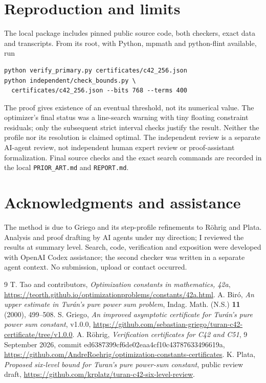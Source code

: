 \documentclass[11pt]{amsart}
\begin{document}
\section{Reproduction and limits}
The local package includes pinned public source code, both checkers,
exact data and transcripts. From its root, with Python, mpmath and
python-flint available, run
\begin{verbatim}
python verify_primary.py certificates/c42_256.json
python independent/check_bounds.py \
  certificates/c42_256.json --bits 768 --terms 400
\end{verbatim}
The proof gives existence of an eventual threshold, not its numerical
value. The optimizer's final status was a line-search warning with tiny
floating constraint residuals; only the subsequent strict interval
checks justify the result. Neither the profile nor its resolution is
claimed optimal. The independent review is a separate AI-agent review,
not independent human expert review or proof-assistant formalization.
Final source checks and the exact search commands are recorded in the
local \texttt{PRIOR\_ART.md} and \texttt{REPORT.md}.

\section*{Acknowledgments and assistance}
The method is due to Griego and its step-profile refinements to R\"ohrig
and Plata. Analysis and proof drafting by AI agents under my direction;
I reviewed the results at summary level. Search, code, verification and exposition were developed with
OpenAI Codex assistance; the second checker was written in a separate
agent context. No submission, upload or contact occurred.

\begin{thebibliography}{9}
 T. Tao and contributors, \emph{Optimization constants in
mathematics, 42a}, \url{https://teorth.github.io/optimizationproblems/constants/42a.html}.
\bibitem{biro} A. Bir\'o, \emph{An upper estimate in Tur\'an's pure power
sum problem}, Indag. Math. (N.S.) \textbf{11} (2000), 499--508.
 S. Griego, \emph{An improved asymptotic certificate for
Tur\'an's pure power sum constant}, v1.0.0,
\url{https://github.com/sebastian-griego/turan-c42-certificate/tree/v1.0.0}.
\bibitem{roehrig} A. R\"ohrig, \emph{Verification certificates for C42 and
C51}, 9 September 2026, commit ed6387399cf6de02eaa4cf10c43787633496619a,
\url{https://github.com/AndreRoehrig/optimization-constants-certificates}.
\bibitem{plata} K. Plata, \emph{Proposed six-level bound for Turan's pure
power-sum constant}, public review draft,
\url{https://github.com/krplatz/turan-c42-six-level-review}.
\end{thebibliography}
\end{document}
